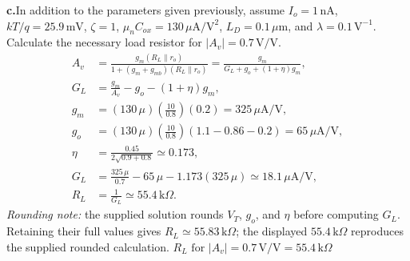 \newpage
\textbf{c.}\quad In addition to the parameters given previously, assume
$I_o=1\,\mathrm{nA}$, $kT/q=25.9\,\mathrm{mV}$, $\zeta=1$,
$\mu_n C_{ox}=130\,\mu\mathrm A/\mathrm V^2$,
$L_D=0.1\,\mu\mathrm m$, and $\lambda=0.1\,\mathrm V^{-1}$.
Calculate the necessary load resistor for $|A_v|=0.7\,\mathrm{V/V}$.
\vspace{.30in}
\begin{align*}
A_v&=\frac{g_m(R_L\parallel r_o)}{1+(g_m+g_{mb})(R_L\parallel r_o)}
=\frac{g_m}{G_L+g_o+(1+\eta)g_m},\\[14pt]
G_L&=\frac{g_m}{A_v}-g_o-(1+\eta)g_m,\\[20pt]
g_m&=(130\,\mu)\left(\frac{10}{0.8}\right)(0.2)
=325\,\mu\mathrm A/\mathrm V,\\[18pt]
g_o&=(130\,\mu)\left(\frac{10}{0.8}\right)(1.1-0.86-0.2)
=65\,\mu\mathrm A/\mathrm V,\\[18pt]
\eta&=\frac{0.45}{2\sqrt{0.9+0.8}}\simeq0.173,\\[20pt]
G_L&=\frac{325\,\mu}{0.7}-65\,\mu-1.173(325\,\mu)
\simeq18.1\,\mu\mathrm A/\mathrm V,\\[20pt]
R_L&=\frac{1}{G_L}\simeq\boxed{55.4\,\mathrm{k}\Omega}.
\end{align*}
\vspace{.35in}
{\small\textit{Rounding note:} the supplied solution rounds $V_T$, $g_o$,
and $\eta$ before computing $G_L$. Retaining their full values gives
$R_L\simeq55.83\,\mathrm{k}\Omega$; the displayed $55.4\,\mathrm{k}\Omega$
reproduces the supplied rounded calculation.}
\vfill
\hfill $R_L\text{ for }|A_v|=0.7\,\mathrm{V/V}=55.4\,\mathrm{k}\Omega$
\vspace{.12in}

